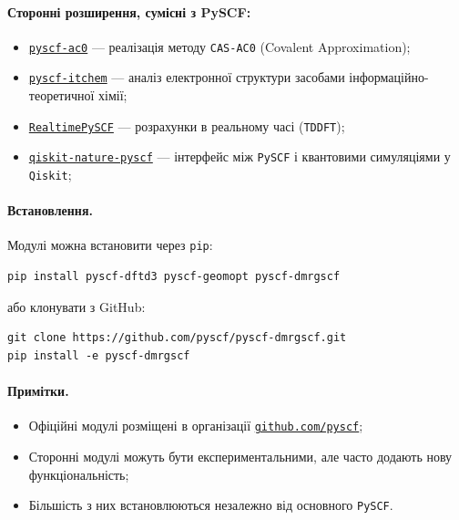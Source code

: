 \paragraph{Сторонні розширення, сумісні з PySCF:}
\begin{itemize}
  \item \href{https://github.com/CQCL/pyscf-ac0}{\texttt{pyscf-ac0}} — реалізація методу \texttt{CAS-AC0} (Covalent Approximation);
  \item \href{https://github.com/ZhaoYilin/pyscf-itchem}{\texttt{pyscf-itchem}} — аналіз електронної структури засобами інформаційно-теоретичної хімії;
  \item \href{https://github.com/jparkhill/RealtimePySCF}{\texttt{RealtimePySCF}} — розрахунки в реальному часі (\texttt{TDDFT});
  \item \href{https://github.com/qiskit-community/qiskit-nature-pyscf}{\texttt{qiskit-nature-pyscf}} — інтерфейс між \texttt{PySCF} і квантовими симуляціями у \texttt{Qiskit};
\end{itemize}

\paragraph{Встановлення.}
Модулі можна встановити через \texttt{pip}:
\begin{verbatim}
pip install pyscf-dftd3 pyscf-geomopt pyscf-dmrgscf
\end{verbatim}
або клонувати з GitHub:
\begin{verbatim}
git clone https://github.com/pyscf/pyscf-dmrgscf.git
pip install -e pyscf-dmrgscf
\end{verbatim}

\paragraph{Примітки.}
\begin{itemize}
  \item Офіційні модулі розміщені в організації \href{https://github.com/pyscf}{\texttt{github.com/pyscf}};
  \item Сторонні модулі можуть бути експериментальними, але часто додають нову функціональність;
  \item Більшість з них встановлюються незалежно від основного \texttt{PySCF}.
\end{itemize}


